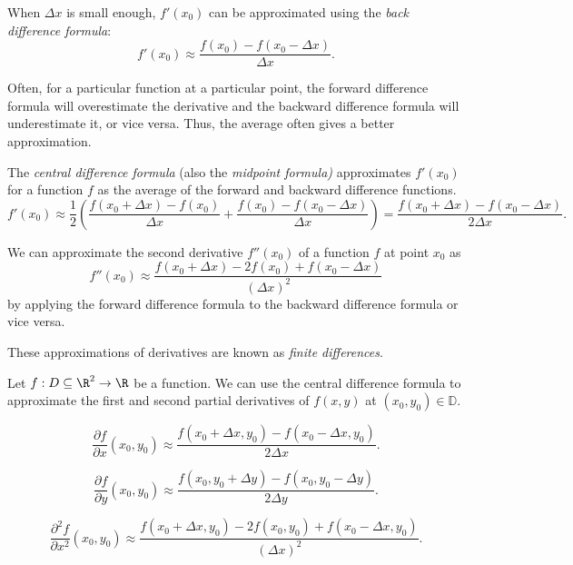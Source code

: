 \documentclass[12pt]{article}
\begin{document}
\begin{defn}
    When $\Delta x$ is small enough, $f'(x_0)$ can be approximated using the \emph{back difference formula}: \[f'(x_0) \approx \frac{f(x_0) - f(x_0 - \Delta x)}{\Delta x}.\]
\end{defn}

\begin{rmk}
    Often, for a particular function at a particular point, the forward difference formula will overestimate the derivative and the backward difference formula will underestimate it, or vice versa. Thus, the average often gives a better approximation.
\end{rmk}

\begin{defn}
    The \emph{central difference formula} (also the \emph{midpoint formula)} approximates $f'(x_0)$ for a function $f$ as the average of the forward and backward difference functions. \[f'(x_0) \approx \frac{1}{2}\left(\frac{f(x_0 + \Delta x) - f(x_0)}{\Delta x} + \frac{f(x_0) - f(x_0 - \Delta x)}{\Delta x}\right) = \frac{f(x_0 + \Delta x) - f(x_0 - \Delta x)}{2\Delta x}.\]
\end{defn}

\begin{rmk}
    We can approximate the second derivative $f''(x_0)$ of a function $f$ at point $x_0$ as \[f''(x_0) \approx \frac{f(x_0 + \Delta x) - 2f(x_0) + f(x_0 - \Delta x)}{\left(\Delta x\right)^2}\] by applying the forward difference formula to the backward difference formula or vice versa.
\end{rmk}

\begin{defn}
    These approximations of derivatives are known as \emph{finite differences}.
\end{defn}

\begin{exmp}
    Let $f: D \subseteq \R^2 \to \R$ be a function. We can use the central difference formula to approximate the first and second partial derivatives of $f(x, y)$ at $(x_0, y_0) \in \mathbb{D}$.

    \[\frac{\partial f}{\partial x}(x_0, y_0) \approx \frac{f(x_0 + \Delta x, y_0) - f(x_0 - \Delta x, y_0)}{2\Delta x}.\]

    \[\frac{\partial f}{\partial y}(x_0, y_0) \approx \frac{f(x_0, y_0  + \Delta y) - f(x_0, y_0 - \Delta y)}{2\Delta y}.\]

    \[\frac{\partial^2 f}{\partial x^2}(x_0, y_0) \approx \frac{f(x_0 + \Delta x, y_0) - 2f(x_0, y_0) + f(x_0 - \Delta x, y_0)}{\left(\Delta x\right)^2}.\]
\end{exmp}
\end{document}
